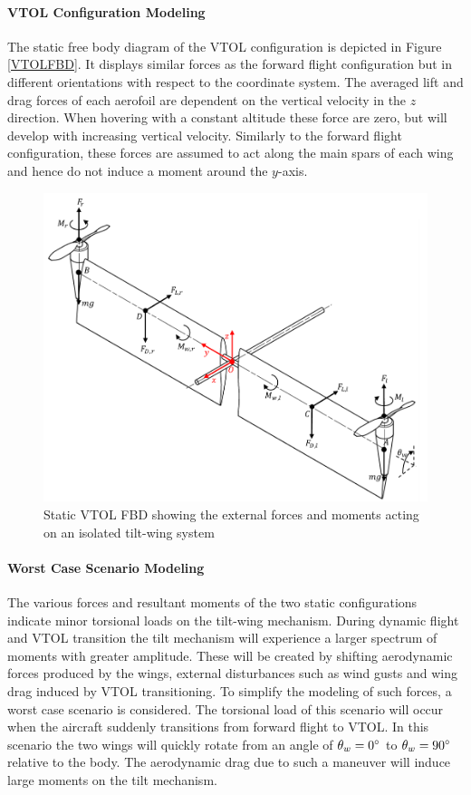\paragraph{VTOL Configuration Modeling}
The static free body diagram of the VTOL configuration is depicted in Figure \ref{VTOLFBD}. It displays similar forces as the forward flight configuration but in different orientations with respect to the coordinate system. The averaged lift and drag forces of each aerofoil are dependent on the vertical velocity in the $z$ direction. When hovering with a constant altitude these force are zero, but will develop with increasing vertical velocity. Similarly to the forward flight configuration, these forces are assumed to act along the main spars of each wing and hence do not induce a moment around the $y$-axis.\\
\begin{figure}[H]
    \centering
    \includegraphics[width = \textwidth]{Tiltwing/VTOLFBD.png}
    \caption{Static VTOL FBD showing the external forces and moments acting on an isolated tilt-wing system}
    \label{fig:VTOLFBD}
\end{figure}

\paragraph{Worst Case Scenario Modeling}
The various forces and resultant moments of the two static configurations indicate minor torsional loads on the tilt-wing mechanism. During dynamic flight and VTOL transition the tilt mechanism will experience a larger spectrum of moments with greater amplitude. These will be created by shifting aerodynamic forces produced by the wings, external disturbances such as wind gusts and wing drag induced by VTOL transitioning. To simplify the modeling of such forces, a worst case scenario is considered. The torsional load of this scenario will occur when the aircraft suddenly transitions from forward flight to VTOL. In this scenario the two wings will quickly rotate from an angle of \(\theta_w=0\degree\) to \(\theta_w=90\degree\) relative to the body. The aerodynamic drag due to such a maneuver will induce large moments on the tilt mechanism.\\

